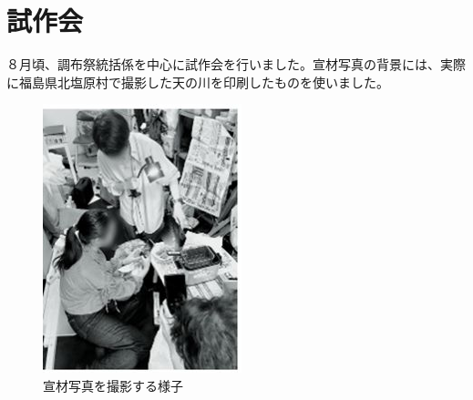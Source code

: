 \documentclass[../super_nova_20yy]{subfiles}
\begin{document}
\section{試作会}
８月頃、調布祭統括係を中心に試作会を行いました。宣材写真の背景には、実際に福島県北塩原村で撮影した天の川を印刷したものを使いました。
\begin{figure}[H]
  \centering
  \begin{minipage}[t]{0.4\columnwidth}
    \centering
    \includegraphics[width=\columnwidth]{画像2.jpg}
    \caption{宣材写真を撮影する様子}
    \label{fig:2}
  \end{minipage}
  \begin{minipage}[t]{0.4\columnwidth}
    \centering

\end{minipage}
\end{figure}
\end{document}
